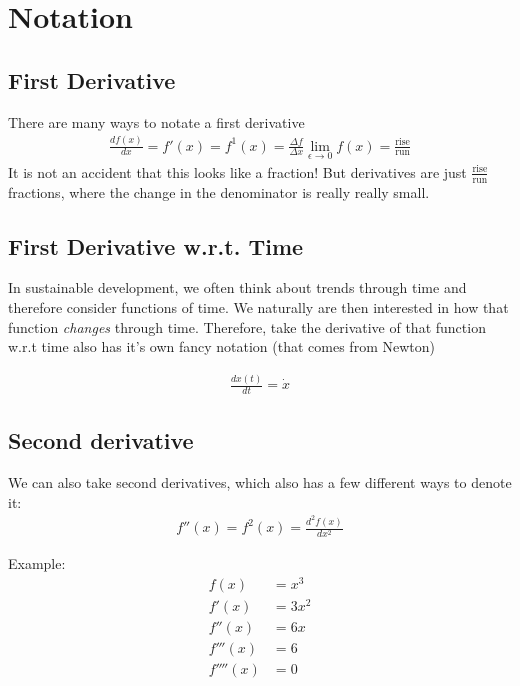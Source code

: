 \documentclass{article}
\begin{document}
\section{Notation}
\subsection{First Derivative}

There are many ways to notate a first derivative
\begin{align}
    \frac{df(x)}{dx} = f'(x) = f^1(x) = \frac{\Delta f}{\Delta x} \lim_{\epsilon \rightarrow 0} f(x) = \frac{\text{rise}}{\text{run}}
\end{align}
It is not an accident that this looks like a fraction! But derivatives are just $\frac{\text{rise}}{\text{run}}$ fractions, where the change in the denominator is really really small. \\

\subsection{First Derivative w.r.t. Time}
In sustainable development, we often think about trends through time and therefore consider functions of time. We naturally are then interested in how that function \textit{changes} through time. Therefore, take the derivative of that function w.r.t time also has it's own fancy notation (that comes from Newton)

\begin{align}
    \frac{d x(t)}{dt} = \dot x
\end{align}

\subsection{Second derivative}

We can also take second derivatives, which also has a few different ways to denote it:
\begin{align}
    f''(x) = f^2(x) = \frac{d^2 f(x)}{dx^2}
\end{align}

Example: 
\begin{align*}
    f(x) &= x^3\\
    f'(x) &= 3x^2\\
    f''(x) &= 6x\\
    f'''(x) &= 6\\
    f''''(x) &= 0
\end{align*}
\end{document}

